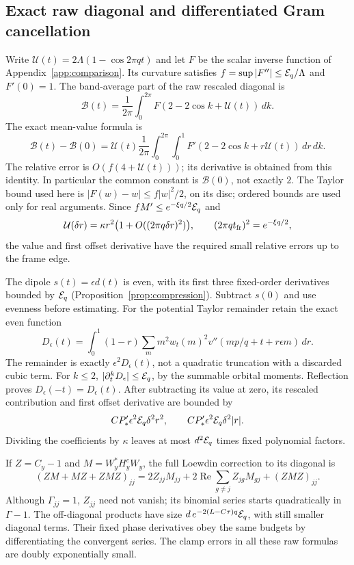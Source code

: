 \subsection{Exact raw diagonal and differentiated Gram cancellation}
Write $\mathcal U(t)=2\Lambda(1-\cos2\pi qt)$ and let $F$ be the scalar inverse function of Appendix~\ref{app:comparison}. Its curvature satisfies $f=\sup|F''|\le\mathcal E_q/\Lambda$ and $F'(0)=1$. The band-average part of the raw rescaled diagonal is
\[
 \mathcal B(t)=\frac1{2\pi}\int_0^{2\pi}F(2-2\cos k+\mathcal U(t))\,dk.
\]
The exact mean-value formula is
\begin{equation}\label{eq:belowbandaverage}
 \mathcal B(t)-\mathcal B(0)
 =\mathcal U(t)\frac1{2\pi}\int_0^{2\pi}\int_0^1
 F'(2-2\cos k+r\mathcal U(t))\,dr\,dk.
\end{equation}
The relative error is $O(f(4+\mathcal U(t)))$; its derivative is obtained from this identity. In particular the common constant is $\mathcal B(0)$, not exactly $2$. The Taylor bound used here is
$|F(w)-w|\le f|w|^2/2$, on its disc; ordered bounds are used only for real arguments. Since $fM'\le e^{-\xi q/2}\mathcal E_q$ and
\[
 \mathcal U(\delta r)=\kappa r^2
       \bigl(1+O((2\pi q\delta r)^2)\bigr),
 \qquad (2\pi qt_{\rm fr})^2=e^{-\xi q/2},
\]
the value and first offset derivative have the required small relative errors up to the frame edge.

The dipole $s(t)=\epsilon d(t)$ is even, with its first three fixed-order derivatives bounded by $\mathcal E_q$ (Proposition~\ref{prop:compression}). Subtract $s(0)$ and use evenness before estimating. For the potential Taylor remainder retain the exact even function
\begin{equation}\label{eq:belowexactTaylor}
 D_\epsilon(t)=\int_0^1(1-r)\sum_m m^2w_t(m)^2
          v''(mp/q+t+r\epsilon m)\,dr.
\end{equation}
The remainder is exactly $\epsilon^2D_\epsilon(t)$, not a quadratic truncation with a discarded cubic term. For $k\le2$,
$|\partial_t^kD_\epsilon|\le\mathcal E_q$, by the summable orbital moments.
Reflection proves $D_\epsilon(-t)=D_\epsilon(t)$. After subtracting its value at zero, its rescaled contribution and first offset derivative are bounded by
\[
 CP_*'\epsilon^2\mathcal E_q\delta^2r^2,\qquad
 CP_*'\epsilon^2\mathcal E_q\delta^2|r|.
\]
Dividing the coefficients by $\kappa$ leaves at most $d^2\mathcal E_q$ times fixed polynomial factors.

If $Z=C_y-1$ and $M=W_y^*H_y^cW_y$, the full Loewdin correction to its diagonal is
\begin{equation}\label{eq:belowfullLoewdin}
 (ZM+MZ+ZMZ)_{jj}
 =2Z_{jj}M_{jj}+2\operatorname{Re}\sum_{g\ne j}Z_{jg}M_{gj}
                         +(ZMZ)_{jj}.
\end{equation}
Although $\Gamma_{jj}=1$, $Z_{jj}$ need not vanish; its binomial series starts quadratically in $\Gamma-1$. The off-diagonal products have size
$d\,e^{-2(L-C\tau)q}\mathcal E_q$, with still smaller diagonal terms. Their fixed phase derivatives obey the same budgets by differentiating the convergent series. The clamp errors in all these raw formulas are doubly exponentially small.

